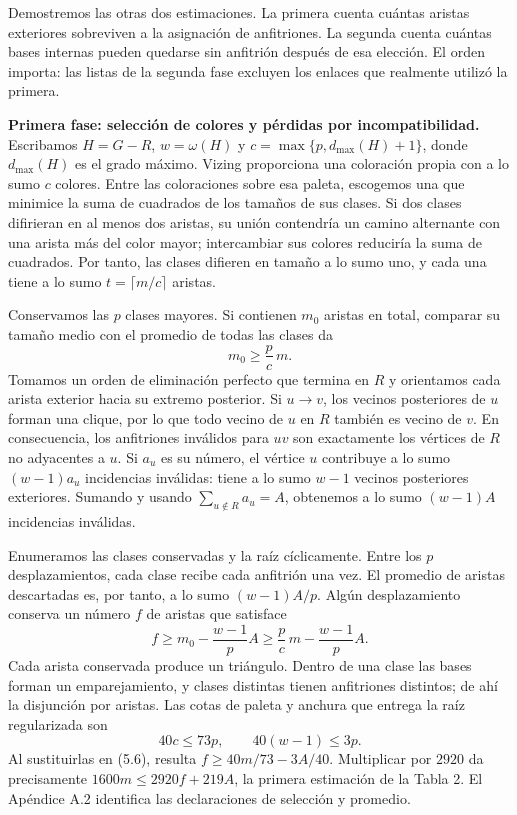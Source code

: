 \documentclass[spanish,11pt,a4paper]{article}
\begin{document}
Demostremos las otras dos estimaciones. La primera cuenta cuántas aristas exteriores sobreviven a la asignación de anfitriones. La segunda cuenta cuántas bases internas pueden quedarse sin anfitrión después de esa elección. El orden importa: las listas de la segunda fase excluyen los enlaces que realmente utilizó la primera.

\textbf{Primera fase: selección de colores y pérdidas por incompatibilidad.} Escribamos \(H=G-R\), \(w=\omega(H)\) y \(c=\max\{p,d_{\max}(H)+1\}\), donde \(d_{\max}(H)\) es el grado máximo. Vizing proporciona una coloración propia con a lo sumo \(c\) colores. Entre las coloraciones sobre esa paleta, escogemos una que minimice la suma de cuadrados de los tamaños de sus clases. Si dos clases difirieran en al menos dos aristas, su unión contendría un camino alternante con una arista más del color mayor; intercambiar sus colores reduciría la suma de cuadrados. Por tanto, las clases difieren en tamaño a lo sumo uno, y cada una tiene a lo sumo \(t=\lceil m/c\rceil\) aristas.

Conservamos las \(p\) clases mayores. Si contienen \(m_0\) aristas en total, comparar su tamaño medio con el promedio de todas las clases da \[
m_0\ge\frac pc\,m.
\tag{5.5}
\] Tomamos un orden de eliminación perfecto que termina en \(R\) y orientamos cada arista exterior hacia su extremo posterior. Si \(u\to v\), los vecinos posteriores de \(u\) forman una clique, por lo que todo vecino de \(u\) en \(R\) también es vecino de \(v\). En consecuencia, los anfitriones inválidos para \(uv\) son exactamente los vértices de \(R\) no adyacentes a \(u\). Si \(a_u\) es su número, el vértice \(u\) contribuye a lo sumo \((w-1)a_u\) incidencias inválidas: tiene a lo sumo \(w-1\) vecinos posteriores exteriores. Sumando y usando \(\sum_{u\notin R}a_u=A\), obtenemos a lo sumo \((w-1)A\) incidencias inválidas.

Enumeramos las clases conservadas y la raíz cíclicamente. Entre los \(p\) desplazamientos, cada clase recibe cada anfitrión una vez. El promedio de aristas descartadas es, por tanto, a lo sumo \((w-1)A/p\). Algún desplazamiento conserva un número \(f\) de aristas que satisface \[
f\ge m_0-\frac{w-1}{p}A
\ge\frac pc\,m-\frac{w-1}{p}A.
\tag{5.6}
\] Cada arista conservada produce un triángulo. Dentro de una clase las bases forman un emparejamiento, y clases distintas tienen anfitriones distintos; de ahí la disjunción por aristas. Las cotas de paleta y anchura que entrega la raíz regularizada son \[
40c\le73p,\qquad 40(w-1)\le3p.
\tag{5.7}
\] Al sustituirlas en (5.6), resulta \(f\ge40m/73-3A/40\). Multiplicar por \(2920\) da precisamente \(1600m\le2920f+219A\), la primera estimación de la Tabla 2. El Apéndice A.2 identifica las declaraciones de selección y promedio.
\end{document}
